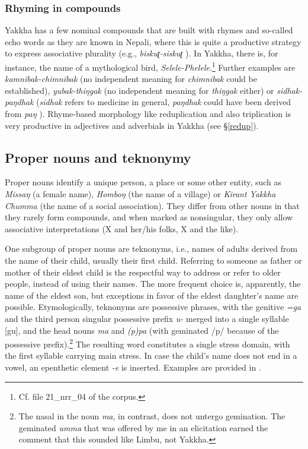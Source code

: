 \subsubsection{Rhyming in compounds}

 Yakkha has a few nominal compounds that are built with rhymes and so-called echo words as they are known in Nepali, where this is quite a productive strategy to express associative plurality (e.g., \emph{biskuʈ-siskuʈ} ). In Yakkha, there is, for instance, the  name of a mythological bird, \emph{Selele-Phelele}.\footnote{Cf. file 21\_nrr\_04 of the corpus.} Further examples are \emph{kamnibak-chimnibak}  (no independent meaning for \emph{chimnibak} could be  established), \emph{yubak-thiŋgak}  (no independent meaning for \emph{thiŋgak} either) or \emph{sidhak-paŋdhak}  (\emph{sidhak} refers to medicine in general, \emph{paŋdhak} could have been derived from \emph{paŋ} ). Rhyme-based morphology like reduplication  and also triplication is very productive in adjectives and adverbials in Yakkha (see §\ref{redup}).



\subsection{Proper nouns and teknonymy}
 
 Proper nouns identify a unique person, a place or some other entity, such as \emph{Missaŋ} (a female name), \emph{Homboŋ} (the name of a village) or \emph{Kirant Yakkha Chumma} (the name of a social association). They differ from other nouns in that they rarely form compounds, and when marked as nonsingular, they only allow associative interpretations (X and her/his folks, X and the like). 
 
 One subgroup of proper nouns are teknonyms, i.e., names of adults derived from the name of their child, usually their first child. Referring to someone as father or mother of their eldest child  is the respectful way to address or refer to older people, instead of using their names. The more frequent choice is, apparently, the name of the eldest son, but exceptions in favor of the eldest daughter's name are possible. Etymologically, teknonyms are possessive phrases, with the genitive \emph{=ga} and the third person singular possessive prefix \emph{u-} merged into a single syllable [gu], and the head nouns \emph{ma}  and \emph{(p)pa}  (with geminated /p/ because of  the possessive prefix).\footnote{The nasal in the noun \emph{ma}, in contrast, does not untergo gemination. The geminated \emph{umma} that was offered by me in an elicitation earned the comment that this sounded like Limbu, not Yakkha.} The resulting word constitutes a single stress domain, with the first syllable carrying main stress. In case the child's name does not end in a vowel, an epenthetic element \emph{-e} is inserted. Examples are provided in \Next. 


